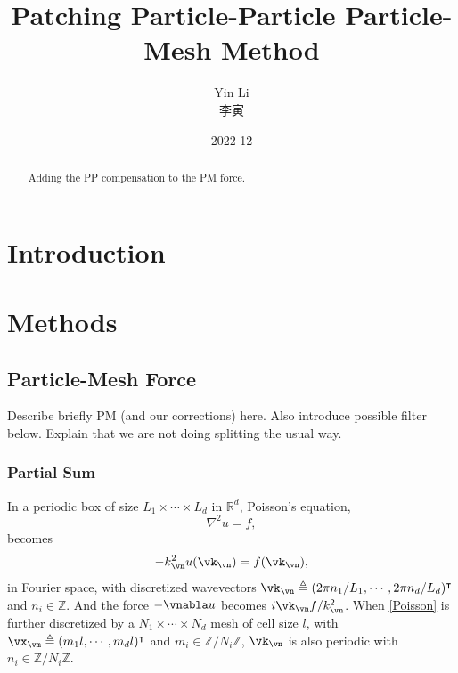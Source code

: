 \documentclass[a4paper]{article}
\newcommand{\gkai}[1]{\begin{CJK*}{UTF8}{gkai}\raisebox{.1em}{(}#1\raisebox{.1em}{)}\end{CJK*}}
\newcommand{\1}{\mathds{1}}
\newcommand{\R}{\mathds{R}}
\newcommand{\Z}{\mathds{Z}}
\newcommand{\YL}[1]{\textcolor{Bittersweet}{#1}}
\begin{document}
\title{Patching Particle-Particle Particle-Mesh Method}


\author{Yin Li \gkai{李寅}}


\date{2022-12}


\maketitle



\begin{abstract}
Adding the PP compensation to the PM force.
\end{abstract}



\section{Introduction}


\section{Methods}


\subsection{Particle-Mesh Force}


\YL{Describe briefly PM (and our corrections) here. Also introduce
possible filter below. Explain that we are not doing splitting the
usual way.}


\subsubsection{Partial Sum}

In a periodic box of size $L_1 \times \cdots \times L_d$ in $\R^d$,
Poisson's equation,
%
\begin{equation}
\nabla^2 u = f,
\label{Poisson}
\end{equation}
%
becomes
%
\begin{equation}
- k_\vn^2 u(\vk_\vn) = f(\vk_\vn),
\end{equation}
%
in Fourier space, with discretized wavevectors $\vk_\vn \triangleq (2\pi
n_1 / L_1, \cdots, 2\pi n_d / L_d )^\intercal$ and $n_i \in \Z$.
And the force $- \vnabla u$ becomes $i \vk_\vn f / k_\vn^2$.
When \eqref{Poisson} is further discretized by a $N_1 \times \cdots
\times N_d$ mesh of cell size $l$, with $\vx_\vm \triangleq (m_1 l,
\cdots, m_d l)^\intercal$ and $m_i \in \Z/N_i\Z$, $\vk_\vn$ is also
periodic with $n_i \in \Z/N_i\Z$.
\end{document}
